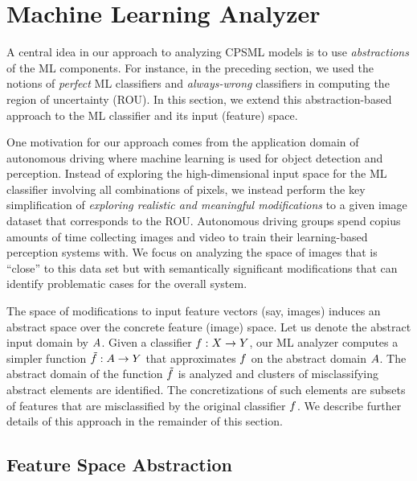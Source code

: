 
\section{Machine Learning Analyzer}
\label{sec:MLanalysis}

A central idea in our approach to analyzing CPSML models
is to use {\em abstractions} of the ML components. 
For instance, in the preceding section, we used the notions of
{\em perfect} ML classifiers and {\em always-wrong} classifiers
in computing the region of uncertainty (ROU).
In this section, we extend this abstraction-based approach to
the ML classifier and its input (feature) space.

One motivation for our approach comes from the application
domain of autonomous driving where machine learning is used for
object detection and perception. 
Instead of exploring the high-dimensional input space for
the ML classifier
involving all combinations of pixels, we instead perform the key
simplification of 
{\it exploring realistic and meaningful modifications} to a 
given image dataset that corresponds to the ROU.
Autonomous driving groups spend copius amounts of time collecting
images and video to train their learning-based perception systems with.
We focus on analyzing the space of images that is ``close'' to this
data set but with semantically significant modifications that can
identify problematic cases for the overall system.

The space of modifications to input feature vectors 
(say, images) induces an abstract space 
over the concrete feature (image) space.
Let us denote the abstract input domain by $A$.
Given a classifier 
$f : X \to Y$, our ML analyzer computes a simpler 
function $\tilde{f} : A \to Y$ that approximates $f$ on 
the abstract domain $A$.
The abstract domain of the function $\tilde{f}$ is analyzed and clusters of misclassifying
abstract elements are identified. The concretizations of such elements are subsets of features that are misclassified by the original classifier $f$.
We describe further details of this approach in the remainder of this section.


\subsection{Feature Space Abstraction}
\label{sec:input_abs}


